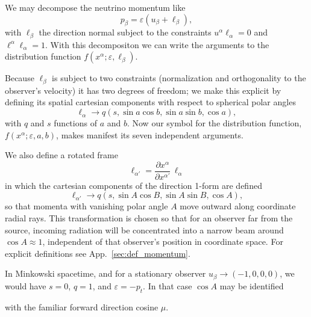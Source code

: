\documentclass[aps,floatfix,prd,superscriptaddress,twocolumn]{revtex4-1}
\newcommand{\todo}[1]{\marginpar{\tiny{\textcolor{red}{#1}}}}
\renewcommand\todo[1]{} %
\begin{document}
We may decompose the neutrino momentum like
\begin{equation}
  \label{eqn:def_momentum}
  p_\beta = \varepsilon (u_\beta + \ell_\beta),
\end{equation}
with $\ell_\beta$ the direction normal subject to the constraints
$u^\alpha \ell_\alpha = 0$ and $\ell^\alpha \ell_\alpha=1$.
With this decompositon we can write the arguments to the distribution function
$f(x^\alpha;\varepsilon,\ell_\beta)$.

Because $\ell_\beta$ is subject to two constraints
(normalization and orthogonality to the observer's velocity)
it has two degrees of freedom; we make this explicit by defining its
spatial cartesian components with respect to spherical polar angles
\begin{equation}
  \label{eqn:def_direction}
  \ell_\alpha \rightarrow
  q (s,\sin a \cos b,\sin a\sin b,\cos a),
\end{equation}
with $q$ and $s$ functions of $a$ and $b$.
Now our symbol for the distribution function,
$f(x^\alpha;\varepsilon,a,b)$,
makes manifest its seven independent arguments.

We also define a rotated frame
\begin{equation}
  \ell_{\alpha'}=\frac{\partial x^\alpha}{\partial x^{\alpha'}}\,\ell_\alpha \nonumber
\end{equation}
in which the cartesian components of the direction 1-form are defined
\begin{equation}
  \label{eqn:def_direction_primed}
  \ell_{\alpha'} \rightarrow
  q (s,\sin A \cos B,\sin A\sin B,\cos A),
\end{equation}
so that momenta with vanishing polar angle $A$ move outward along coordinate
radial rays.
This transformation is chosen so that for an observer far from the source,
incoming radiation will be concentrated into a narrow beam around $\cos A\approx1$,
independent of that observer's position in coordinate space.
For explicit definitions see App.~\ref{sec:def_momentum}.

In Minkowski spacetime, and for a stationary observer
$u_\beta\rightarrow(-1,0,0,0)$, we would have $s=0$, $q=1$,
and $\varepsilon=-p_t$. In that case $\cos A$ may be identified
\todo{cite someone that uses $\mu$}
with the familiar forward direction cosine $\mu$.
\end{document}
